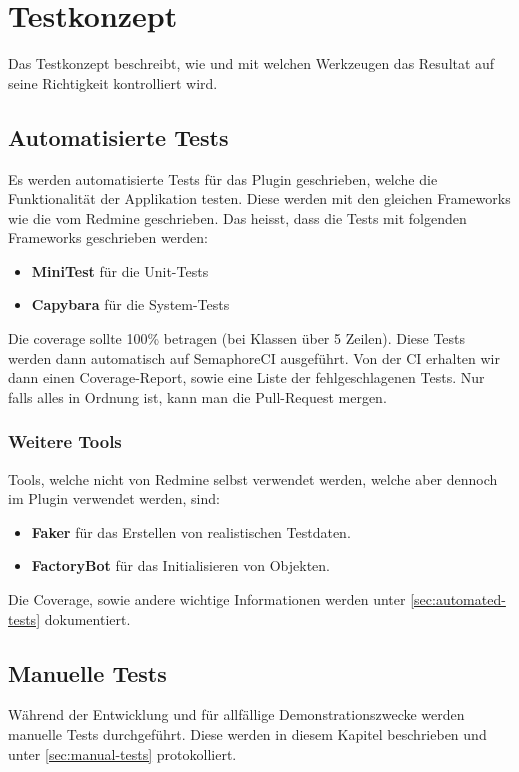 \section{Testkonzept}
\label{sec:testkonzept}
Das Testkonzept beschreibt, wie und mit welchen Werkzeugen das Resultat auf seine Richtigkeit kontrolliert wird.

\subsection{Automatisierte Tests}
Es werden automatisierte Tests für das Plugin geschrieben, welche die Funktionalität der Applikation testen.
Diese werden mit den gleichen Frameworks wie die vom Redmine geschrieben. Das heisst, dass die Tests mit
folgenden Frameworks geschrieben werden:
\begin{itemize}
  \item \textbf{MiniTest} für die Unit-Tests
  \item \textbf{Capybara} für die System-Tests
\end{itemize}
Die coverage sollte 100\% betragen (bei Klassen über 5 Zeilen). Diese Tests werden dann automatisch auf 
SemaphoreCI ausgeführt. Von der CI erhalten wir dann einen Coverage-Report, sowie eine Liste der
fehlgeschlagenen Tests. Nur falls alles in Ordnung ist, kann man die Pull-Request mergen.

\subsubsection{Weitere Tools}
Tools, welche nicht von Redmine selbst verwendet werden, welche aber dennoch im Plugin verwendet werden, sind:
\begin{itemize}
  \item \textbf{Faker} für das Erstellen von realistischen Testdaten.
  \item \textbf{FactoryBot} für das Initialisieren von Objekten.
\end{itemize}
Die Coverage, sowie andere wichtige Informationen werden unter \ref{sec:automated-tests} dokumentiert.

\subsection{Manuelle Tests}
\label{sec:manual-testing}
Während der Entwicklung und für allfällige Demonstrationszwecke werden manuelle Tests durchgeführt. Diese
werden in diesem Kapitel beschrieben und unter \ref{sec:manual-tests} protokolliert.

